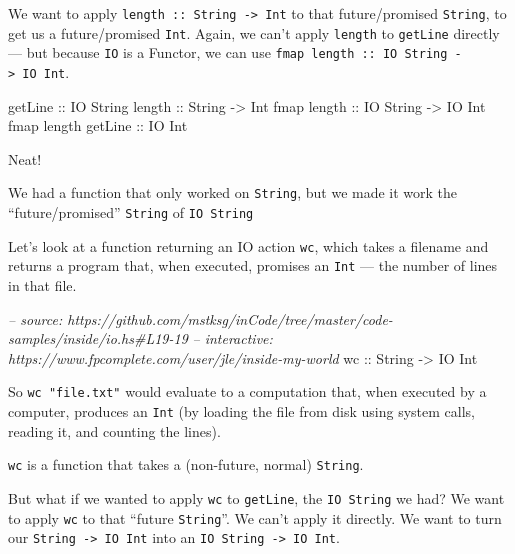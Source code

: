 \documentclass[]{article}
\newenvironment{Shaded}{}{}
\newcommand{\DataTypeTok}[1]{\textcolor[rgb]{0.56,0.13,0.00}{{#1}}}
\newcommand{\CommentTok}[1]{\textcolor[rgb]{0.38,0.63,0.69}{\textit{{#1}}}}
\newcommand{\OtherTok}[1]{\textcolor[rgb]{0.00,0.44,0.13}{{#1}}}
\newcommand{\NormalTok}[1]{{#1}}
\begin{document}
We want to apply \texttt{length\ ::\ String\ -\textgreater{}\ Int} to
that future/promised \texttt{String}, to get us a future/promised
\texttt{Int}. Again, we can't apply \texttt{length} to \texttt{getLine}
directly --- but because \texttt{IO} is a Functor, we can use
\texttt{fmap\ length\ ::\ IO\ String\ -\textgreater{}\ IO\ Int}.

\begin{Shaded}
\begin{Highlighting}[]
\NormalTok{getLine}\OtherTok{             ::} \DataTypeTok{IO} \DataTypeTok{String}
\NormalTok{length}\OtherTok{              ::} \DataTypeTok{String} \OtherTok{->} \DataTypeTok{Int}
\NormalTok{fmap}\OtherTok{ length         ::} \DataTypeTok{IO} \DataTypeTok{String} \OtherTok{->} \DataTypeTok{IO} \DataTypeTok{Int}
\NormalTok{fmap length}\OtherTok{ getLine ::} \DataTypeTok{IO} \DataTypeTok{Int}
\end{Highlighting}
\end{Shaded}

Neat!

We had a function that only worked on \texttt{String}, but we made it
work the ``future/promised'' \texttt{String} of \texttt{IO\ String}

Let's look at a function returning an IO action \texttt{wc}, which takes
a filename and returns a program that, when executed, promises an
\texttt{Int} --- the number of lines in that file.

\begin{Shaded}
\begin{Highlighting}[]
\CommentTok{-- source: https://github.com/mstksg/inCode/tree/master/code-samples/inside/io.hs#L19-19}
\CommentTok{-- interactive: https://www.fpcomplete.com/user/jle/inside-my-world}
\OtherTok{wc ::} \DataTypeTok{String} \OtherTok{->} \DataTypeTok{IO} \DataTypeTok{Int}
\end{Highlighting}
\end{Shaded}

So \texttt{wc\ "file.txt"} would evaluate to a computation that, when
executed by a computer, produces an \texttt{Int} (by loading the file
from disk using system calls, reading it, and counting the lines).

\texttt{wc} is a function that takes a (non-future, normal)
\texttt{String}.

But what if we wanted to apply \texttt{wc} to \texttt{getLine}, the
\texttt{IO\ String} we had? We want to apply \texttt{wc} to that
``future \texttt{String}''. We can't apply it directly. We want to turn
our \texttt{String\ -\textgreater{}\ IO\ Int} into an
\texttt{IO\ String\ -\textgreater{}\ IO\ Int}.
\end{document}
